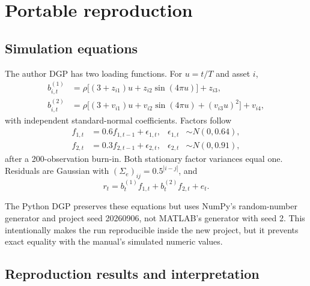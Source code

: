 \documentclass[11pt,a4paper]{article}
\begin{document}
\section{Portable reproduction}
\label{sec:reproduction}

\subsection{Simulation equations}

The author DGP has two loading functions. For $u=t/T$ and asset $i$,
\begin{align}
 b^{(1)}_{i,t}&=\rho\big[(3+z_{i1})u+z_{i2}\sin(4\pi u)\big]+z_{i3},\\
 b^{(2)}_{i,t}&=\rho\big[(3+v_{i1})u+v_{i2}\sin(4\pi u)+(v_{i3}u)^2\big]+v_{i4},
\end{align}
with independent standard-normal coefficients. Factors follow
\begin{align}
 f_{1,t}&=0.6f_{1,t-1}+\epsilon_{1,t},& \epsilon_{1,t}&\sim N(0,0.64),\\
 f_{2,t}&=0.3f_{2,t-1}+\epsilon_{2,t},& \epsilon_{2,t}&\sim N(0,0.91),
\end{align}
after a 200-observation burn-in. Both stationary factor variances equal one. Residuals are Gaussian with $(\Sigma_e)_{ij}=0.5^{|i-j|}$, and
\begin{equation}
 r_t=b_t^{(1)}f_{1,t}+b_t^{(2)}f_{2,t}+e_t.
\end{equation}

The Python DGP preserves these equations but uses NumPy's random-number generator and project seed 20260906, not MATLAB's generator with seed 2. This intentionally makes the run reproducible inside the new project, but it prevents exact equality with the manual's simulated numeric values.

\subsection{Reproduction results and interpretation}
\end{document}
